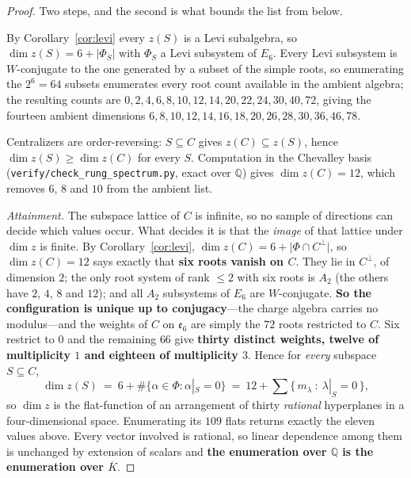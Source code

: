 \documentclass[11pt,reqno]{amsart}
\theoremstyle{plain}
\theoremstyle{definition}
\theoremstyle{remark}
\newcommand{\Q}{\mathbb{Q}}
\newcommand{\ee}{\mathfrak{e}}
\newcommand{\fn}[1]{\texttt{\small #1}}
\begin{document}
\begin{proof}
Two steps, and the second is what bounds the list from below.

By Corollary~\ref{cor:levi} every $z(S)$ is a Levi subalgebra, so $\dim z(S)=6+\lvert
\Phi_S\rvert$ with $\Phi_S$ a Levi subsystem of $E_6$. Every Levi subsystem is
$W$-conjugate to the one generated by a subset of the simple roots, so enumerating the
$2^6=64$ subsets enumerates every root count available in the ambient algebra; the
resulting counts are $0,2,4,6,8,10,12,14,20,22,24,30,40,72$, giving the fourteen ambient
dimensions $6,8,10,12,14,16,18,20,26,28,30,36,46,78$.

Centralizers are order-reversing: $S\subseteq C$ gives $z(C)\subseteq z(S)$, hence
$\dim z(S)\ge\dim z(C)$ for every $S$. Computation in the Chevalley basis
(\fn{verify/check\_\allowbreak rung\_\allowbreak spectrum.py}, exact over $\Q$) gives
$\dim z(C)=12$, which removes $6$, $8$ and $10$ from the ambient list.

\emph{Attainment.} The subspace lattice of $C$ is infinite, so no sample of directions can
decide which values occur. What decides it is that the \emph{image} of that lattice under
$\dim z$ is finite. By Corollary~\ref{cor:levi}, $\dim z(C)=6+\lvert\Phi\cap
C^{\perp}\rvert$, so $\dim z(C)=12$ says exactly that \textbf{six roots vanish on $C$}.
They lie in $C^{\perp}$, of dimension $2$; the only root system of rank $\le 2$ with six
roots is $A_2$ (the others have $2$, $4$, $8$ and $12$); and all $A_2$ subsystems of $E_6$
are $W$-conjugate. \textbf{So the configuration is unique up to conjugacy}---the charge
algebra carries no modulus---and the weights of $C$ on $\ee_6$ are simply the $72$ roots
restricted to $C$. Six restrict to $0$ and the remaining $66$ give \textbf{thirty distinct
weights, twelve of multiplicity $1$ and eighteen of multiplicity $3$}. Hence for
\emph{every} subspace $S\subseteq C$,
\[
  \dim z(S)\ =\ 6+\#\{\alpha\in\Phi:\alpha|_S=0\}\ =\ 12+\sum\bigl\{\,m_\lambda\ :\
  \lambda|_S=0\,\bigr\},
\]
so $\dim z$ is the flat-function of an arrangement of thirty \emph{rational} hyperplanes in
a four-dimensional space. Enumerating its $109$ flats returns exactly the eleven values
above. Every vector involved is rational, so linear dependence among them is unchanged by
extension of scalars and \textbf{the enumeration over $\Q$ is the enumeration over
$\overline K$}.
\end{proof}
\end{document}
